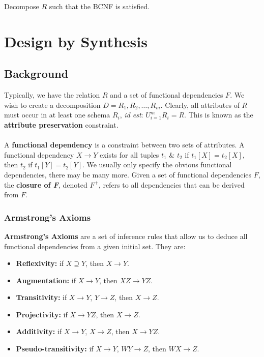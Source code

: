 \documentclass[a4paper,11pt]{article}
\begin{document}
Decompose $R$ such that the BCNF is satisfied.


\section{Design by Synthesis}
\subsection{Background}
Typically, we have the relation $R$ and a set of functional dependencies $F$. 
We wish to create a decomposition $D = R_1, R_2, \dots, R_m$. 
Clearly, all attributes of $R$ must occur in at least one schema $R_i$, \textit{id est}: $U^{m}_{i=1} R_i = R$. 
This is known as the \textbf{attribute preservation} constraint.
\\\\ 
A \textbf{functional dependency} is a constraint between two sets of attributes. 
A functional dependency $X \rightarrow Y$ exists for all tuples $t_1$ \& $t_2$ if $t_1[X] = t_2[X]$, then $t_2$ if
$t_1[Y] = t_2[Y]$.
We usually only specify the obvious functional dependencies, there may be many more.
Given a set of functional dependencies $F$, the \textbf{closure of \textit{F}}, denoted $F^+$, refers to all dependencies that
can be derived from $F$.

\subsubsection{Armstrong's Axioms}
\textbf{Armstrong's Axioms} are a set of inference rules that allow us to deduce all functional dependencies from a given 
initial set.
They are:
\begin{itemize}
    \item   \textbf{Reflexivity:} if $X \supseteq Y$, then $X \rightarrow Y$. 
    \item   \textbf{Augmentation:} if $X \rightarrow Y$, then $XZ \rightarrow YZ$.
    \item   \textbf{Transitivity:} if $X \rightarrow Y$, $Y \rightarrow Z$, then $X \rightarrow Z$. 
    \item   \textbf{Projectivity:} if $X \rightarrow YZ$, then $X \rightarrow Z$. 
    \item   \textbf{Additivity:} if $X \rightarrow Y$, $X \rightarrow Z$, then $X \rightarrow YZ$. 
    \item   \textbf{Pseudo-transitivity:} if $X \rightarrow Y$, $WY \rightarrow Z$, then $WX \rightarrow Z$. 
\end{itemize}
\end{document}
